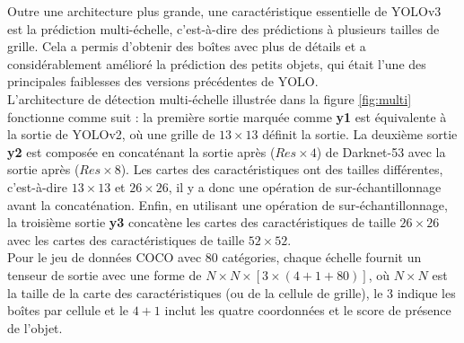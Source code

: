 \documentclass{article}
\begin{document}
Outre une architecture plus grande, une caractéristique essentielle de YOLOv3 est la prédiction multi-échelle, c'est-à-dire des prédictions à plusieurs tailles de grille. Cela a permis d'obtenir des boîtes avec plus de détails et a considérablement amélioré la prédiction des petits objets, qui était l'une des principales faiblesses des versions précédentes de YOLO.
\vspace{.2cm}\\
L'architecture de détection multi-échelle illustrée dans la figure \ref{fig:multi} fonctionne comme suit : la première sortie marquée comme \textbf{y1} est équivalente à la sortie de YOLOv2, où une grille de $13 \times 13$ définit la sortie. La deuxième sortie \textbf{y2} est composée en concaténant la sortie après ($Res \times 4$) de Darknet-53 avec la sortie après ($Res \times 8$). Les cartes des caractéristiques ont des tailles différentes, c'est-à-dire $13 \times 13$ et $26 \times 26$, il y a donc une opération de sur-échantillonnage avant la concaténation. Enfin, en utilisant une opération de sur-échantillonnage, la troisième sortie \textbf{y3} concatène les cartes des caractéristiques de taille $26 \times 26$ avec les cartes des caractéristiques de taille $52 \times 52$.
\vspace{.2cm}\\
Pour le jeu de données COCO avec 80 catégories, chaque échelle fournit un tenseur de sortie avec une forme de $N \times N \times [3 \times (4 + 1 + 80)]$, où $N \times N$ est la taille de la carte des caractéristiques (ou de la cellule de grille), le 3 indique les boîtes par cellule et le $4 + 1$ inclut les quatre coordonnées et le score de présence de l'objet.
\end{document}
